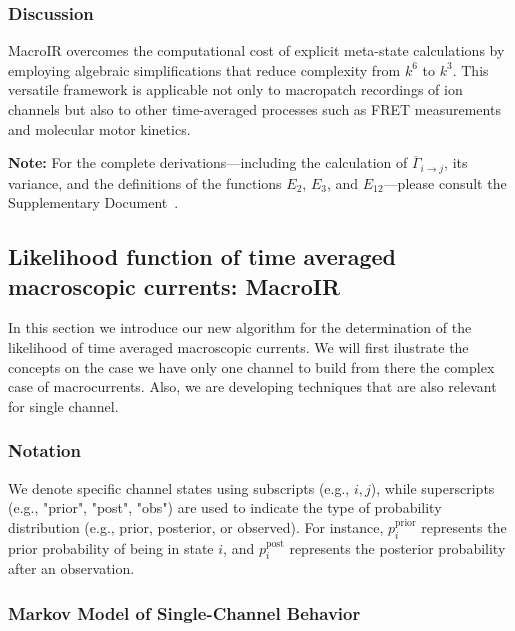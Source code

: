 \documentclass[pdflatex,sn-mathphys-num]{sn-jnl}%
\theoremstyle{thmstyleone}%
\theoremstyle{thmstyletwo}%
\theoremstyle{thmstylethree}%
\begin{document}
\subsubsection{Discussion}
MacroIR overcomes the computational cost of explicit meta-state calculations by employing algebraic simplifications that reduce complexity from \(k^6\) to \(k^3\). This versatile framework is applicable not only to macropatch recordings of ion channels but also to other time-averaged processes such as FRET measurements and molecular motor kinetics.

\textbf{Note:} For the complete derivations—including the calculation of \(\overline{\Gamma}_{i\rightarrow j}\), its variance, and the definitions of the functions \(E_2\), \(E_3\), and \(E_{12}\)—please consult the Supplementary Document~\cite{supplementary}.


\subsection{Likelihood function of time averaged macroscopic currents: MacroIR}
In this section we introduce our new algorithm for the determination of the likelihood of time averaged macroscopic currents. We will first ilustrate the concepts on the case we have only one channel to build from there the complex case of macrocurrents. Also, we are developing techniques that are also relevant for single channel.   

\subsubsection{Notation}
We denote specific channel states using subscripts (e.g., \( i, j \)), while superscripts (e.g., "prior", "post", "obs") are used to indicate the type of probability distribution (e.g., prior, posterior, or observed). For instance, \( p_i^{\text{prior}} \) represents the prior probability of being in state \( i \), and \( p_i^{\text{post}} \) represents the posterior probability after an observation.

\subsubsection{Markov Model of Single-Channel Behavior}
\end{document}

